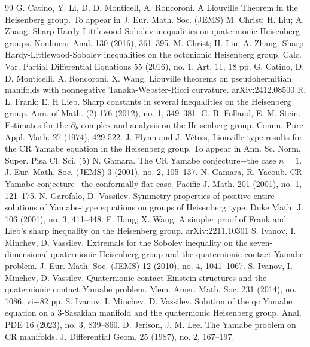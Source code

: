 \documentclass[10pt,a4paper]{amsart}
\numberwithin{equation}{section}
\begin{document}
\begin{thebibliography}{99}
 G. Catino, Y. Li, D. D. Monticell, A. Roncoroni. A Liouville Theorem in the Heisenberg group. To appear in J. Eur. Math. Soc. (JEMS)
 M. Christ; H. Liu; A. Zhang. Sharp Hardy-Littlewood-Sobolev inequalities on quaternionic Heisenberg groups. Nonlinear Anal. 130 (2016), 361–395.
 M. Christ; H. Liu; A. Zhang. Sharp Hardy-Littlewood-Sobolev inequalities on the octonionic Heisenberg group. Calc. Var. Partial Differential Equations 55 (2016), no. 1, Art. 11, 18 pp.
 G. Catino, D. D. Monticelli, A. Roncoroni, X. Wang. Liouville theorems on pseudohermitian manifolds with nonnegative Tanaka-Webster-Ricci curvature. arXiv:2412.08500
 R. L. Frank; E. H Lieb. Sharp constants in several inequalities on the Heisenberg group. Ann. of Math. (2) 176 (2012), no. 1, 349–381.
 G. B. Folland, E. M. Stein. Estimates for the $\bar{\partial}_b$ complex and analysis on the Heisenberg group. Comm. Pure Appl. Math. 27 (1974), 429-522.
 J. Flynn and J. Vétois, Liouville-type results for the CR Yamabe equation in the Heisenberg group. To appear in Ann. Sc. Norm. Super. Pisa Cl. Sci. (5)
 N. Gamara. The CR Yamabe conjecture$-$the case $n=1$. J. Eur. Math. Soc. (JEMS) 3 (2001), no. 2, 105–137.
 N. Gamara, R. Yacoub. CR Yamabe conjecture$-$the conformally flat case. Pacific J. Math. 201 (2001), no. 1, 121–175.
 N. Garofalo, D. Vassilev. Symmetry properties of positive entire solutions of Yamabe-type equations on groups of Heisenberg type. Duke Math. J. 106 (2001), no. 3, 411–448.
 F. Hang; X. Wang. A simpler proof of Frank and Lieb's sharp inequality on the Heisenberg group. arXiv:2211.10301
 S. Ivanov, I. Minchev, D. Vassilev. Extremals for the Sobolev inequality on the seven-dimensional quaternionic Heisenberg group and the quaternionic contact Yamabe problem. J. Eur. Math. Soc. (JEMS) 12 (2010), no. 4, 1041–1067.
 S. Ivanov, I. Minchev, D. Vassilev. Quaternionic contact Einstein structures and the quaternionic contact Yamabe problem. Mem. Amer. Math. Soc. 231 (2014), no. 1086, vi+82 pp.
 S. Ivanov, I. Minchev, D. Vassilev. Solution of the qc Yamabe equation on a 3-Sasakian manifold and the quaternionic Heisenberg group. Anal. PDE 16 (2023), no. 3, 839–860.
 D. Jerison, J. M. Lee. The Yamabe problem on CR manifolds. J. Differential Geom. 25 (1987), no. 2, 167–197.

\end{thebibliography}
\end{document}
